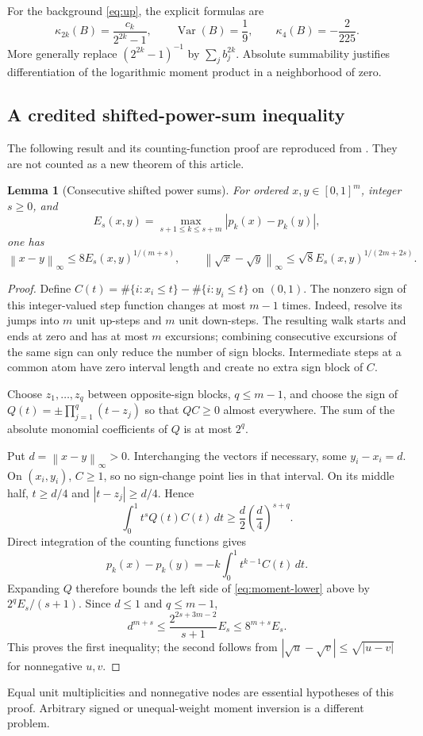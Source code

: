 \documentclass[11pt,a4paper]{article}
\numberwithin{equation}{section}
\newtheorem{lemma}[theorem]{Lemma}
\theoremstyle{definition}
\theoremstyle{remark}
\DeclareMathOperator{\Var}{Var}
\newcommand{\norm}[1]{\left\lVert#1\right\rVert}
\begin{document}
For the background \eqref{eq:up}, the explicit formulas are
\begin{equation}
 \kappa_{2k}(B)=\frac{c_k}{2^{2k}-1},\qquad
 \Var(B)=\frac19,\qquad \kappa_4(B)=-\frac2{225}.
 \label{eq:up-cumulants}
\end{equation}
More generally replace $(2^{2k}-1)^{-1}$ by $\sum_jb_j^{2k}$.
Absolute summability justifies differentiation of the logarithmic moment
product in a neighborhood of zero.

\subsection{A credited shifted-power-sum inequality}
The following result and its counting-function proof are reproduced from
\cite[Theorem 4.1]{companion}. They are not counted as a new theorem of this
article.

\begin{lemma}[Consecutive shifted power sums]
\label{lem:moments}
For ordered $x,y\in[0,1]^m$, integer $s\ge0$, and
\[
 E_s(x,y)=\max_{s+1\le k\le s+m}|p_k(x)-p_k(y)|,
\]
one has
\begin{equation}
 \norm{x-y}_\infty\le8E_s(x,y)^{1/(m+s)},\qquad
 \norm{\sqrt x-\sqrt y}_\infty
 \le\sqrt8 E_s(x,y)^{1/(2m+2s)}.
 \label{eq:moment-inverse}
\end{equation}
\end{lemma}
\begin{proof}
Define $C(t)=\#\{i:x_i\le t\}-\#\{i:y_i\le t\}$ on $(0,1)$.
The nonzero sign of this integer-valued step function changes at most
$m-1$ times. Indeed, resolve its jumps into $m$ unit up-steps and $m$
unit down-steps. The resulting walk starts and ends at zero and has at most
$m$ excursions; combining consecutive excursions of the same sign can only
reduce the number of sign blocks. Intermediate steps at a common atom have
zero interval length and create no extra sign block of $C$.

Choose $z_1,\ldots,z_q$ between opposite-sign blocks, $q\le m-1$, and
choose the sign of $Q(t)=\pm\prod_{j=1}^q(t-z_j)$ so that $QC\ge0$
almost everywhere. The sum of the absolute monomial coefficients of $Q$
is at most $2^q$.

Put $d=\norm{x-y}_\infty>0$. Interchanging the vectors if necessary,
some $y_i-x_i=d$. On $(x_i,y_i)$, $C\ge1$, so no sign-change point
lies in that interval. On its middle half, $t\ge d/4$ and
$|t-z_j|\ge d/4$. Hence
\begin{equation}
 \int_0^1t^sQ(t)C(t)\,dt\ge\frac d2\left(\frac d4\right)^{s+q}.
 \label{eq:moment-lower}
\end{equation}
Direct integration of the counting functions gives
\[
 p_k(x)-p_k(y)=-k\int_0^1t^{k-1}C(t)\,dt.
\]
Expanding $Q$ therefore bounds the left side of
\eqref{eq:moment-lower} above by $2^q E_s/(s+1)$.
Since $d\le1$ and $q\le m-1$,
\[
 d^{m+s}\le\frac{2^{2s+3m-2}}{s+1}E_s
 \le8^{m+s}E_s.
\]
This proves the first inequality; the second follows from
$|\sqrt u-\sqrt v|\le\sqrt{|u-v|}$ for nonnegative $u,v$.
\end{proof}
Equal unit multiplicities and nonnegative nodes are essential hypotheses of
this proof. Arbitrary signed or unequal-weight moment inversion is a
different problem.
\end{document}
